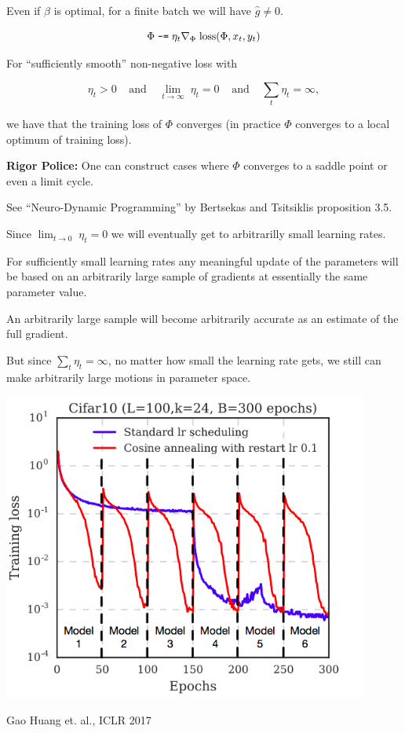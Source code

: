 {\vfill
Even if $\beta$ is optimal, for a finite batch we will have $\hat{g} \not = 0$.


$$\Phi \;\mbox{\tt -=} \; \eta_t \nabla_\Phi\;\mathrm{loss}(\Phi,x_t,y_t)$$

\vfill
For ``sufficiently smooth'' non-negative loss with

\vfill
$$\eta_t > 0\;\;\;\;\mbox{and}\;\;\;\;\lim_{t \rightarrow \infty} \;\eta_t = 0\;\;\;\;\mbox{and}\;\;\;\;\sum_t \eta_t = \infty,$$

\vfill
we have that the training loss of $\Phi$ converges (in practice $\Phi$ converges to a local optimum of training loss).

\vfill
{\Large {\bf Rigor Police:} One can construct cases where $\Phi$ converges to a saddle point or even a limit cycle.}

\vfill
{\Large See ``Neuro-Dynamic Programming'' by Bertsekas and Tsitsiklis proposition 3.5.}


Since $\lim_{t \rightarrow 0} \;\eta_t = 0$ we will eventually get to arbitrarilly small learning rates.

\vfill
For sufficiently small learning rates any meaningful update of the parameters will be based on an arbitrarily large sample
of gradients at essentially the same parameter value.

\vfill
An arbitrarily large sample will become arbitrarily accurate as an estimate of the full gradient.

\vfill
But since $\sum_t \eta_t = \infty$, no matter how small the learning rate gets, we still can make arbitrarily large motions in parameter space.


\centerline{\includegraphics[height= 4in]{../images/AnnealingSGD}}
\centerline{\Large Gao Huang et. al., ICLR 2017}

}
